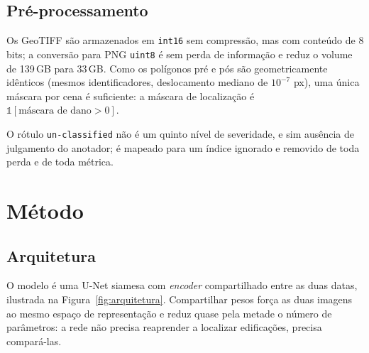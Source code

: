 \documentclass[11pt,a4paper]{article}
\begin{document}
\subsection{Pré-processamento}

Os GeoTIFF são armazenados em \texttt{int16} sem compressão, mas com conteúdo de
8 bits; a conversão para PNG \texttt{uint8} é sem perda de informação e reduz o
volume de 139\,GB para 33\,GB. Como os polígonos pré e pós são geometricamente
idênticos (mesmos identificadores, deslocamento mediano de $10^{-7}$ px), uma
única máscara por cena é suficiente: a máscara de localização é
$\mathbb{1}[\text{máscara de dano} > 0]$.

O rótulo \texttt{un-classified} não é um quinto nível de severidade, e sim
ausência de julgamento do anotador; é mapeado para um índice ignorado e removido
de toda perda e de toda métrica.

\section{Método}

\subsection{Arquitetura}

O modelo é uma U-Net siamesa com \emph{encoder} compartilhado entre as duas
datas, ilustrada na Figura~\ref{fig:arquitetura}. Compartilhar pesos força as
duas imagens ao mesmo espaço de representação e reduz quase pela metade o número
de parâmetros: a rede não precisa reaprender a localizar edificações, precisa
compará-las.
\end{document}
